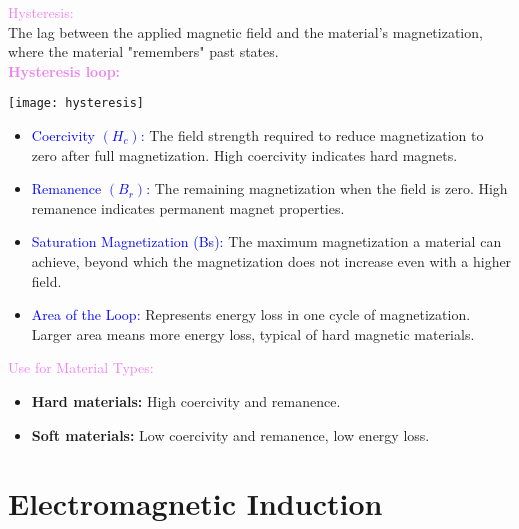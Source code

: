 \documentclass{beamer}
\begin{document}
\begin{frame}
\textcolor{violet}{Hysteresis:}\\
The lag between the applied magnetic field and the material's magnetization, where the material "remembers" past states.\\
\textcolor{violet}{\textbf{Hysteresis loop:}}\\

\begin{center}
\texttt{[image: hysteresis]}
\end{center}

\end{frame}


\begin{frame}

\begin{itemize}
\item \textcolor{blue}{Coercivity $(H_c)$:} The field strength required to reduce magnetization to zero after full magnetization. High coercivity indicates hard magnets.
\item \textcolor{blue}{Remanence $(B_r)$:} The remaining magnetization when the field is zero. High remanence indicates permanent magnet properties.
\item \textcolor{blue}{Saturation Magnetization (Bs):} The maximum magnetization a material can achieve, beyond which the magnetization does not increase even with a higher field.
\item \textcolor{blue}{Area of the Loop:} Represents energy loss in one cycle of magnetization. Larger area means more energy loss, typical of hard magnetic materials.
\end{itemize}
\textcolor{violet}{Use for Material Types:}\\
\begin{itemize}
\item \textbf{Hard materials:} High coercivity and remanence.
\item \textbf{Soft materials:} Low coercivity and remanence, low energy loss.
\end{itemize}
\end{frame}



\section{Electromagnetic Induction}
\end{document}
